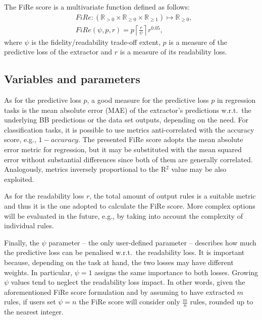\documentclass{article}
\newcommand{\fire}{FiRe}
\begin{document}
The \fire{} score is a multivariate function defined as follows:
%
\begin{align}
	&\fire: \left( \mathbb{R}_{>0} \times \mathbb{R}_{\geq 0} \times \mathbb{R}_{\geq1} \right) \mapsto \mathbb{R}_{\geq 0},\\
	&\fire(\psi, p, r) = p \left \lceil{\frac{r}{\psi}}\right \rceil r^{0.05},
\end{align}
%
where $\psi$ is the fidelity/readability trade-off extent, $p$ is a measure of the predictive loss of the extractor and $r$ is a measure of its readability loss.

\subsection{Variables and parameters}\label{sec:fire-var}
As for the predictive loss $p$, a good measure for the predictive loss $p$ in regression tasks is the mean absolute error (MAE) of the extractor's predictions w.r.t.\ the underlying BB predictions or the data set outputs, depending on the need.
%
For classification tasks, it is possible to use metrics anti-correlated with the accuracy score, e.g., $1-accuracy$.
%
The presented \fire{} score adopts the mean absolute error metric for regression, but it may be substituted with the mean squared error without substantial differences since both of them are generally correlated.
%
Analogously, metrics inversely proportional to the R$^2$ value may be also exploited.

As for the readability loss $r$, the total amount of output rules is a suitable metric and thus it is the one adopted to calculate the \fire{} score.
%
More complex options will be evaluated in the future, e.g., by taking into account the complexity of individual rules.

Finally, the $\psi$ parameter -- the only user-defined parameter -- describes how much the predictive loss can be penalised w.r.t.\ the readability loss.
%
It is important because, depending on the task at hand, the two losses may have different weights.
%
In particular, $\psi=1$ assigns the same importance to both losses.
%
Growing $\psi$ values tend to neglect the readability loss impact.
%
In other words, given the aforementioned \fire{} score formulation and by assuming to have extracted $m$ rules, if users set $\psi=n$ the \fire{} score will consider only $\frac{m}{n}$ rules, rounded up to the nearest integer.
\end{document}
